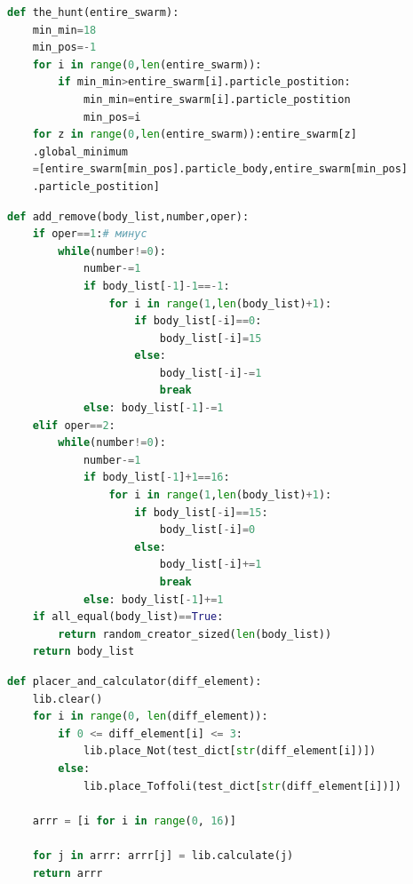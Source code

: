 \documentclass[14pt]{extarticle} %
\begin{document}


\begin{lstlisting}[language=Python, caption={Функция поиска глобального минимума }, label=take_genes]
def the_hunt(entire_swarm):
    min_min=18
    min_pos=-1
    for i in range(0,len(entire_swarm)):
        if min_min>entire_swarm[i].particle_postition:
            min_min=entire_swarm[i].particle_postition
            min_pos=i
    for z in range(0,len(entire_swarm)):entire_swarm[z]
    .global_minimum
    =[entire_swarm[min_pos].particle_body,entire_swarm[min_pos]
    .particle_postition]

\end{lstlisting}

\begin{lstlisting}[language=Python, caption={Функция добавления-убавления позиций}, label=take_genes]
def add_remove(body_list,number,oper):
    if oper==1:# минус
        while(number!=0):
            number-=1
            if body_list[-1]-1==-1:
                for i in range(1,len(body_list)+1):
                    if body_list[-i]==0:
                        body_list[-i]=15
                    else:
                        body_list[-i]-=1
                        break
            else: body_list[-1]-=1
    elif oper==2:
        while(number!=0):
            number-=1
            if body_list[-1]+1==16:
                for i in range(1,len(body_list)+1):
                    if body_list[-i]==15:
                        body_list[-i]=0
                    else:
                        body_list[-i]+=1
                        break
            else: body_list[-1]+=1
    if all_equal(body_list)==True:
        return random_creator_sized(len(body_list))
    return body_list

\end{lstlisting}







\begin{lstlisting}[language=Python, caption={Функция вычисления вектора истинности }, label=take_genes]
def placer_and_calculator(diff_element):
    lib.clear()
    for i in range(0, len(diff_element)):
        if 0 <= diff_element[i] <= 3:
            lib.place_Not(test_dict[str(diff_element[i])])
        else:
            lib.place_Toffoli(test_dict[str(diff_element[i])])

    arrr = [i for i in range(0, 16)]

    for j in arrr: arrr[j] = lib.calculate(j)
    return arrr

\end{lstlisting}
\end{document}
